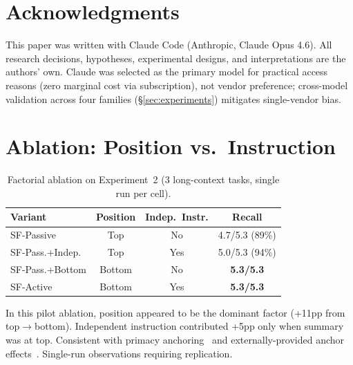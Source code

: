 \documentclass{article}
\begin{document}
\section*{Acknowledgments}

This paper was written with Claude Code (Anthropic, Claude Opus 4.6). All research decisions, hypotheses, experimental designs, and interpretations are the authors' own. Claude was selected as the primary model for practical access reasons (zero marginal cost via subscription), not vendor preference; cross-model validation across four families (\S\ref{sec:experiments}) mitigates single-vendor bias.




\appendix

\section{Ablation: Position vs.\ Instruction}
\label{sec:ablation-appendix}

\begin{table}[H]
\centering
\caption{Factorial ablation on Experiment~2 (3 long-context tasks, single run per cell).}
\label{tab:ablation}
\small
\begin{tabular}{@{}lccc@{}}
\toprule
\textbf{Variant} & \textbf{Position} & \textbf{Indep.\ Instr.} & \textbf{Recall} \\
\midrule
SF-Passive & Top & No & 4.7/5.3 (89\%) \\
SF-Pass.+Indep. & Top & Yes & 5.0/5.3 (94\%) \\
SF-Pass.+Bottom & Bottom & No & \textbf{5.3/5.3} \\
SF-Active & Bottom & Yes & \textbf{5.3/5.3} \\
\bottomrule
\end{tabular}
\end{table}

In this pilot ablation, position appeared to be the dominant factor (+11pp from top$\to$bottom). Independent instruction contributed +5pp only when summary was at top. Consistent with primacy anchoring~\citep{liu2023lost} and externally-provided anchor effects~\citep{epley2006anchoring}. Single-run observations requiring replication.
\end{document}
